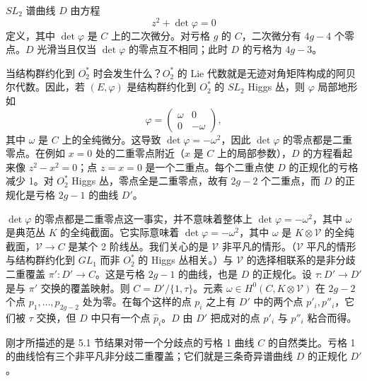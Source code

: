 \documentclass[11pt,a4paper]{article}
\begin{document}
$SL_2$ 谱曲线 $D$ 由方程
\begin{equation}\tag{5.10}
z^2 + \det\varphi = 0
\end{equation}
定义，其中 $\det\varphi$ 是 $C$ 上的二次微分。对亏格 $g$ 的 $C$，二次微分有 $4g-4$ 个零点。$D$ 光滑当且仅当 $\det\varphi$ 的零点互不相同；此时 $D$ 的亏格为 $4g-3$。

当结构群约化到 $O_2^*$ 时会发生什么？$O_2^*$ 的 Lie 代数就是无迹对角矩阵构成的阿贝尔代数。因此，若 $(E,\varphi)$ 是结构群约化到 $O_2^*$ 的 $SL_2$ Higgs 丛，则 $\varphi$ 局部地形如
\begin{equation}\tag{5.11}
\varphi = \begin{pmatrix}
\omega & 0\\
0 & -\omega
\end{pmatrix},
\end{equation}
其中 $\omega$ 是 $C$ 上的全纯微分。这导致 $\det\varphi = -\omega^2$，因此 $\det\varphi$ 的零点都是二重零点。在例如 $x=0$ 处的二重零点附近（$x$ 是 $C$ 上的局部参数），$D$ 的方程看起来像 $z^2-x^2=0$；点 $z=x=0$ 是一个二重点。每个二重点使 $D$ 的正规化的亏格减少 1。对 $O_2^*$ Higgs 丛，零点全是二重零点，故有 $2g-2$ 个二重点，而 $D$ 的正规化是亏格 $2g-1$ 的曲线 $D'$。


$\det\varphi$ 的零点都是二重零点这一事实，并不意味着整体上 $\det\varphi = -\omega^2$，其中 $\omega$ 是典范丛 $K$ 的全纯截面。它实际意味着 $\det\varphi = -\omega^2$，其中 $\omega$ 是 $K\otimes\mathcal{V}$ 的全纯截面，$\mathcal{V}\to C$ 是某个 2 阶线丛。我们关心的是 $\mathcal{V}$ 非平凡的情形。（$\mathcal{V}$ 平凡的情形与结构群约化到 $GL_1$ 而非 $O_2^*$ 的 Higgs 丛相关。）与 $\mathcal{V}$ 的选择相联系的是非分歧二重覆盖 $\pi': D'\to C$。这是亏格 $2g-1$ 的曲线，也是 $D$ 的正规化。设 $\tau: D'\to D'$ 是与 $\pi'$ 交换的覆盖映射。则 $C = D'/\{1,\tau\}$。元素 $\omega\in H^0(C,K\otimes\mathcal{V})$ 在 $2g-2$ 个点 $p_1,\dots,p_{2g-2}$ 处为零。在每个这样的点 $p_i$ 之上有 $D'$ 中的两个点 $p'_i,p''_i$，它们被 $\tau$ 交换，但 $D$ 中只有一个点 $\hat{p}_i$。$D$ 由 $D'$ 把成对的点 $p'_i$ 与 $p''_i$ 粘合而得。

刚才所描述的是 5.1 节结果对带一个分歧点的亏格 1 曲线 $C$ 的自然类比。亏格 1 的曲线恰有三个非平凡非分歧二重覆盖；它们就是三条奇异谱曲线 $D$ 的正规化 $D'$。
\end{document}
